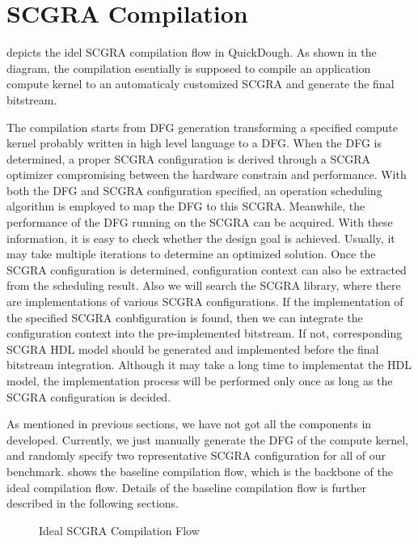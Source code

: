 \section{SCGRA Compilation} \label{sec:scgracompile}
 depicts the idel SCGRA compilation flow in QuickDough. As shown in the diagram, the compilation esentially is supposed to compile an application compute kernel to an automaticaly customized SCGRA and generate the final bitstream. 

The compilation starts from DFG generation transforming a specified compute kernel probably written in high level language to a DFG. When the DFG is determined, a proper SCGRA configuration is derived through a SCGRA optimizer compromising between the hardware constrain and performance. With both the DFG and SCGRA configuration specified, an operation scheduling algorithm is employed to map the DFG to this SCGRA. Meanwhile, the performance of the DFG running on the SCGRA can be acquired. With these information, it is easy to check whether the design goal is achieved. Usually, it may take multiple iterations to determine an optimized solution. Once the SCGRA configuration is determined, configuration context can also be extracted from the scheduling result. Also we will search the SCGRA library, where there are implementations of various SCGRA configurations. If the implementation of the specified SCGRA conbfiguration is found, then we can integrate the configuration context into the pre-implemented bitstream. If not, corresponding SCGRA HDL model should be generated and implemented before the final bitstream integration. Although it may take a long time to implementat the HDL model, the implementation process will be performed only once as long as the SCGRA configuration is decided.

As mentioned in previous sections, we have not got all the components in  developed. Currently, we just manually generate the DFG of the compute kernel, and randomly specify two representative SCGRA configuration for all of our benchmark.  shows the baseline compilation flow, which is the backbone of the ideal compilation flow. Details of the baseline compilation flow is further described in the following sections.

\begin{figure}[H]
\caption{Ideal SCGRA Compilation Flow}
\label{fig:full-scgra-compilation}
\end{figure}

